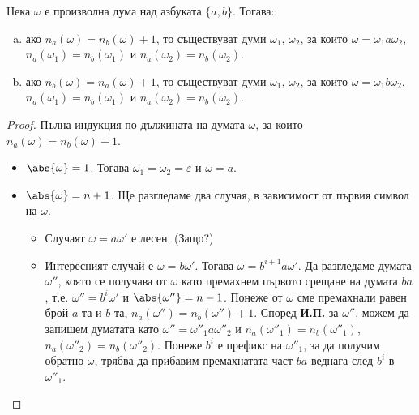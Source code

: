 \begin{problem}
  \label{pr:nanb}
  Нека $\omega$ е произволна дума над азбуката $\{a,b\}$. 
  Тогава:
  \begin{enumerate}[a)]
  \item 
    ако $n_a(\omega) = n_b(\omega) + 1$, то съществуват думи $\omega_1$, $\omega_2$, за които
    $\omega = \omega_1 a \omega_2$, $n_a(\omega_1) = n_b(\omega_1)$ и $n_a(\omega_2) = n_b(\omega_2)$.
  \item
    ако $n_b(\omega) = n_a(\omega) + 1$, то съществуват думи $\omega_1$, $\omega_2$, за които
    $\omega = \omega_1 b \omega_2$, $n_a(\omega_1) = n_b(\omega_1)$ и $n_a(\omega_2) = n_b(\omega_2)$.
  \end{enumerate}
\end{problem}
\begin{proof}
  Пълна индукция по дължината на думата $\omega$, за които $n_a(\omega) = n_b(\omega)+1$.
  \begin{itemize}
  \item 
    $\abs{\omega} = 1$. Тогава $\omega_1 = \omega_2 = \varepsilon$ и $\omega = a$.
  \item
    $\abs{\omega} = n+1$. Ще разгледаме два случая, в зависимост от първия символ на $\omega$.
    \begin{itemize}
    \item 
      Случаят $\omega = a\omega'$ е лесен. (Защо?)
    \item
      Интересният случай е $\omega = b\omega'$.    
      Тогава $\omega = b^{i+1}a\omega'$. Да разгледаме думата $\omega''$, която се получава от $\omega$
      като премахнем първото срещане на думата $ba$, т.е. 
      $\omega'' = b^i\omega'$ и $\abs{\omega''} = n-1$.
      Понеже от $\omega$ сме премахнали равен брой $a$-та и $b$-та, $n_a(\omega'') = n_b(\omega'')+1$.
      Според {\bf И.П.} за $\omega''$, можем да запишем думатата като $\omega'' = \omega''_1a\omega''_2$
      и $n_a(\omega''_1) = n_b(\omega''_1)$, $n_a(\omega''_2) = n_b(\omega''_2)$.
      Понеже $b^i$ е префикс на $\omega''_1$, за да получим обратно $\omega$, трябва 
      да прибавим премахнатата част $ba$ веднага след $b^i$ в $\omega''_1$.
    \end{itemize}
  \end{itemize}
\end{proof}

